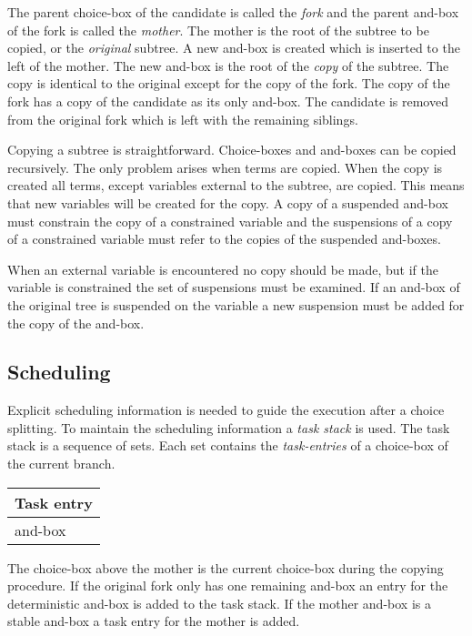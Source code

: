 The parent choice-box of the candidate is called the {\em fork} and
the parent and-box of the fork is called the {\em mother}. The mother is the
root of the subtree to be copied, or the {\em original} subtree. A new
and-box is created which is inserted to the left of the mother. The
new and-box is the root of the {\em copy} of the subtree. The copy is
identical to the original except for the copy of the fork. The copy of the
fork has a copy of the candidate as its only and-box. The candidate is
removed from the original fork which is left with the remaining
siblings.

Copying a subtree is straightforward. Choice-boxes and and-boxes can
be copied recursively. The only problem arises when terms are copied.
When the copy is created all terms, except variables external to the
subtree, are copied. This means that new variables will be created for
the copy. A copy of a suspended and-box must constrain the copy of 
a constrained variable and the suspensions of a copy of a constrained
variable must refer to the copies of the suspended and-boxes.

When an external variable is encountered no copy should be made, but if
the variable is constrained the set of suspensions must be examined.  If
an  and-box of the original tree is suspended on the variable a new
suspension must be added for the copy of the and-box.

\subsection*{Scheduling}

Explicit scheduling information is needed to guide the execution after
a choice splitting. To maintain the scheduling information a {\em task
stack} is used. The task stack is a sequence of sets. Each set contains
the {\em task-entries} of a choice-box of the current branch.


\begin{center} \begin{tabular}{|l|}\hline
Task entry \\
\hline
\hline
and-box \\
\hline
\end{tabular} \end{center}

The choice-box above the mother is the current choice-box during the
copying procedure. If the original fork only has one remaining and-box
an entry for the deterministic and-box is added to the task stack.  If
the mother and-box is a stable and-box a task entry for the mother is
added. 

